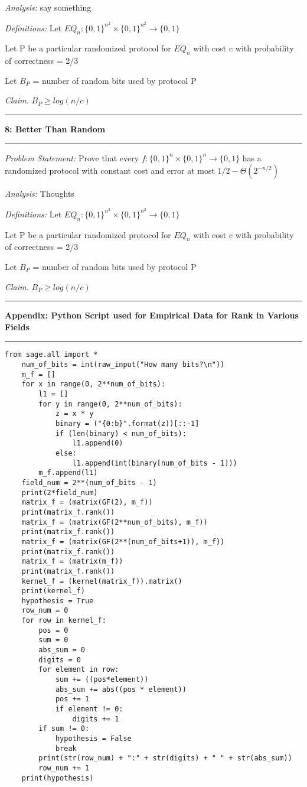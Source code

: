 \documentclass[11pt]{article}
\newcommand\question[2]{\vspace{.25in}\hrule\textbf{#1: #2}\vspace{.5em}\hrule\vspace{.10in}}
\newcommand\newAppendix[2]{\vspace{.25in}\hrule\textbf{#1 #2}\vspace{.5em}\hrule\vspace{.10in}}
\newcommand\analysis{\vspace{.10in}\emph{Analysis: }\newline}
\newcommand\problem{\emph{Problem Statement:}\newline}
\newcommand\definitions{\emph{Definitions:}\newline}
\newcommand\claim{\emph{Claim.}\newline}
\begin{document}
\analysis
say something

\definitions
Let $EQ_n: {\{0, 1\}}^{n^2} \times {\{0, 1\}}^{n^2} \to \{0, 1\}$

Let P be a particular randomized protocol for $EQ_n$ with cost c with probability of correctness = 2/3

Let $B_P$ = number of random bits used by protocol P 

\claim
$B_{P} \geq log(n/c)$

\proof 

\newpage
\question{8}{Better Than Random}

\problem
Prove that every $f : {\{0, 1\}}^n \times {\{0, 1\}}^n \to \{0, 1\}$ has a randomized protocol with constant cost and error at most $1/2 - \Theta(2^{-n/2})$

\analysis
Thoughts

\definitions
Let $EQ_n: {\{0, 1\}}^{n^2} \times {\{0, 1\}}^{n^2} \to \{0, 1\}$

Let P be a particular randomized protocol for $EQ_n$ with cost c with probability of correctness = 2/3

Let $B_P$ = number of random bits used by protocol P 

\claim
$B_{P} \geq log(n/c)$

\proof 
\newpage
\newAppendix{Appendix:}{Python Script used for Empirical Data for Rank in Various Fields}
\begin{lstlisting}
from sage.all import *
    num_of_bits = int(raw_input("How many bits?\n"))
    m_f = []
    for x in range(0, 2**num_of_bits):
        l1 = []
        for y in range(0, 2**num_of_bits):
            z = x * y
            binary = ("{0:b}".format(z))[::-1]
            if (len(binary) < num_of_bits):
                l1.append(0)
            else:
                l1.append(int(binary[num_of_bits - 1]))
        m_f.append(l1)
    field_num = 2**(num_of_bits - 1)
    print(2*field_num)
    matrix_f = (matrix(GF(2), m_f))
    print(matrix_f.rank())
    matrix_f = (matrix(GF(2**num_of_bits), m_f))
    print(matrix_f.rank()) 
    matrix_f = (matrix(GF(2**(num_of_bits+1)), m_f))
    print(matrix_f.rank())
    matrix_f = (matrix(m_f))
    print(matrix_f.rank())
    kernel_f = (kernel(matrix_f)).matrix()
    print(kernel_f)
    hypothesis = True
    row_num = 0
    for row in kernel_f:
        pos = 0
        sum = 0
        abs_sum = 0
        digits = 0
        for element in row:
            sum += ((pos*element))
            abs_sum += abs((pos * element))
            pos += 1
            if element != 0:
                digits += 1
        if sum != 0:
            hypothesis = False
            break
        print(str(row_num) + ":" + str(digits) + " " + str(abs_sum))
        row_num += 1
    print(hypothesis) 
       
\end{lstlisting}
\end{document}
